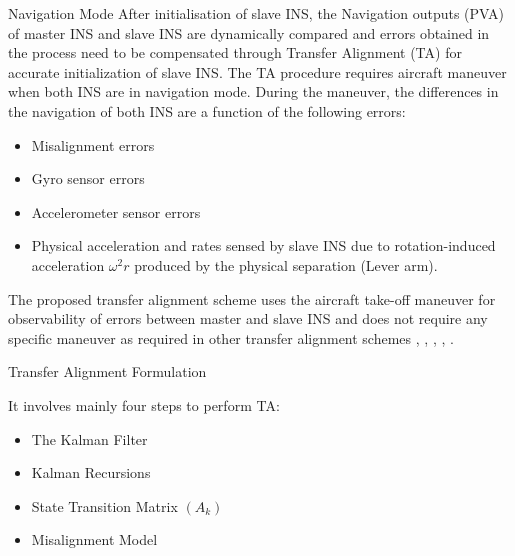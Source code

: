 \documentclass[final]{beamer}
\newlength{\colwidth}
\begin{document}
\begin{frame}[t]
\begin{columns}[t]
\begin{column}{\colwidth}
\begin{block}{Navigation Mode}
After initialisation of slave INS, the Navigation outputs (PVA) of master INS and slave INS are dynamically compared and errors obtained in the process need to be compensated through Transfer Alignment (TA) for accurate initialization of slave INS. The TA procedure requires aircraft maneuver when both INS are in navigation mode. During the maneuver, the differences in the navigation of both INS are a function of the following errors:
\begin{itemize}
    \item Misalignment errors
    \item Gyro sensor errors
    \item Accelerometer sensor errors
    \item Physical acceleration and rates sensed by slave INS due to rotation-induced acceleration $\omega^2r$ produced by the physical separation (Lever arm).
\end{itemize}

The proposed transfer alignment scheme uses the aircraft take-off maneuver for observability of errors between master and slave INS and does not require any specific maneuver as required in other transfer alignment schemes \cite{dai2019rapid}, \cite{gao2007performance}, \cite{hongzhong2011study}, , \cite{tarrant1993rapid} \cite{xiong2006observability}.

\end{block}

  \begin{block}{Transfer Alignment Formulation}
  
 It involves mainly four steps to perform TA:
 \begin{itemize}
    \item The Kalman Filter
    \item Kalman Recursions
    \item State Transition Matrix $(A_k)$
    \item Misalignment Model
\end{itemize}


\end{block}
\end{column}
\end{columns}
\end{frame}
\end{document}
